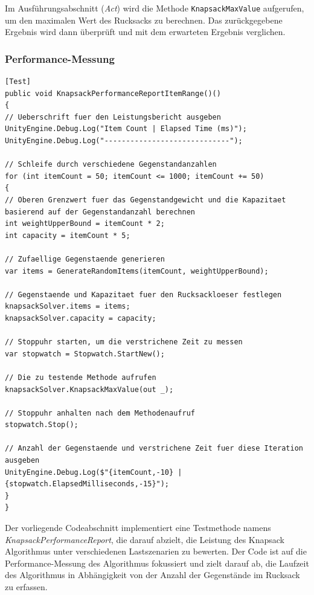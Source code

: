 Im Ausführungsabschnitt (\textit{Act}) wird die Methode \texttt{KnapsackMaxValue} aufgerufen, um den maximalen Wert des Rucksacks zu berechnen. Das zurückgegebene Ergebnis wird dann überprüft und mit dem erwarteten Ergebnis verglichen.

\subsubsection{Performance-Messung}

\begin{lstlisting}[style=csharp, caption={Performance Messung bei hoher Anzahl an Gegenstaenden}, label={code:performanceRange}]
[Test]
public void KnapsackPerformanceReportItemRange()()
{
// Ueberschrift fuer den Leistungsbericht ausgeben
UnityEngine.Debug.Log("Item Count | Elapsed Time (ms)");
UnityEngine.Debug.Log("-----------------------------");

// Schleife durch verschiedene Gegenstandanzahlen
for (int itemCount = 50; itemCount <= 1000; itemCount += 50)
{
// Oberen Grenzwert fuer das Gegenstandgewicht und die Kapazitaet basierend auf der Gegenstandanzahl berechnen
int weightUpperBound = itemCount * 2;
int capacity = itemCount * 5;

// Zufaellige Gegenstaende generieren
var items = GenerateRandomItems(itemCount, weightUpperBound);

// Gegenstaende und Kapazitaet fuer den Rucksackloeser festlegen
knapsackSolver.items = items;
knapsackSolver.capacity = capacity;

// Stoppuhr starten, um die verstrichene Zeit zu messen
var stopwatch = Stopwatch.StartNew();

// Die zu testende Methode aufrufen
knapsackSolver.KnapsackMaxValue(out _);

// Stoppuhr anhalten nach dem Methodenaufruf
stopwatch.Stop();

// Anzahl der Gegenstaende und verstrichene Zeit fuer diese Iteration ausgeben
UnityEngine.Debug.Log($"{itemCount,-10} | {stopwatch.ElapsedMilliseconds,-15}");
}
}
\end{lstlisting}

Der vorliegende Codeabschnitt implementiert eine Testmethode namens \textit{KnapsackPerformanceReport}, die darauf abzielt, die Leistung des Knapsack Algorithmus unter verschiedenen Lastszenarien zu bewerten. Der Code ist auf die Performance-Messung des Algorithmus fokussiert und zielt darauf ab, die Laufzeit des Algorithmus in Abhängigkeit von der Anzahl der Gegenstände im Rucksack zu erfassen.


